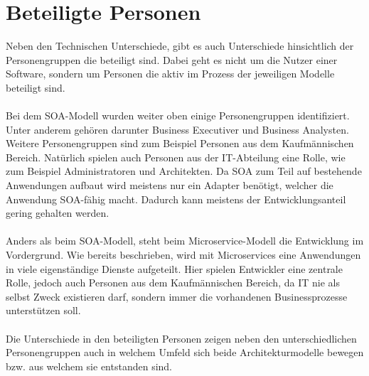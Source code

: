 \section{Beteiligte Personen}
\label{sec:FazitBeteiligtePersonen}
Neben den Technischen Unterschiede, gibt es auch Unterschiede hinsichtlich der Personengruppen die beteiligt sind. Dabei geht es nicht um die Nutzer einer Software, sondern um Personen die aktiv im Prozess der jeweiligen Modelle beteiligt sind.
\\\\
Bei dem SOA-Modell wurden weiter oben einige Personengruppen identifiziert. Unter anderem gehören darunter Business Executiver und Business Analysten. Weitere Personengruppen sind zum Beispiel Personen aus dem Kaufmännischen Bereich. Natürlich spielen auch Personen aus der IT-Abteilung eine Rolle, wie zum Beispiel Administratoren und Architekten. Da SOA zum Teil auf bestehende Anwendungen aufbaut wird meistens nur ein Adapter benötigt, welcher die Anwendung SOA-fähig macht. Dadurch kann meistens der Entwicklungsanteil gering gehalten werden.
\\\\
Anders als beim SOA-Modell, steht beim Microservice-Modell die Entwicklung im Vordergrund. Wie bereits beschrieben, wird mit Microservices eine Anwendungen in viele eigenständige Dienste aufgeteilt. Hier spielen Entwickler eine zentrale Rolle, jedoch auch Personen aus dem Kaufmännischen Bereich, da IT nie als selbst Zweck existieren darf, sondern immer die vorhandenen Businessprozesse unterstützen soll.
\\\\
Die Unterschiede in den beteiligten Personen zeigen neben den unterschiedlichen Personengruppen auch in welchem Umfeld sich beide Architekturmodelle bewegen bzw. aus welchem sie entstanden sind.